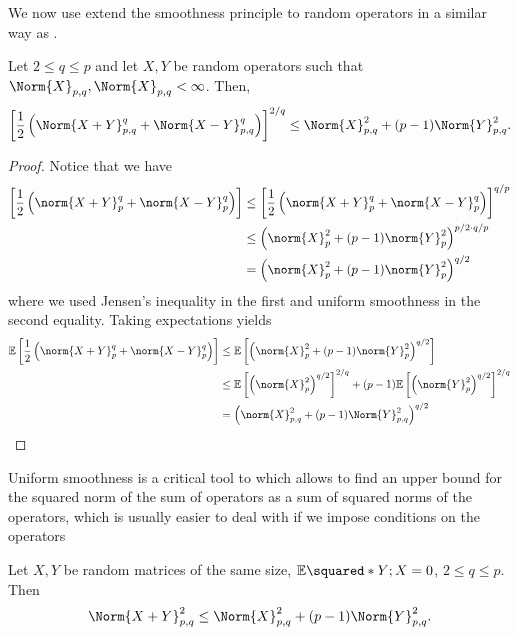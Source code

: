 We now use extend the smoothness principle to random operators in a similar way as \cite{huang2020matrix}.
\begin{corl}
    Let \( 2 \leq q \leq p \) and let \( X,Y \) be random operators such that \( \Norm{X}_{p,q}, \Norm{X}_{p,q}< \infty \). Then,
\[ \left[ \frac{1}{2} \left(\Norm{X+Y}_{p,q}^{q}+ \Norm{X-Y}_{p,q}^{q}\right)\right]^{2/q}\leq \Norm{X}_{p,q}^{2}+ (p-1) \Norm{Y}_{p,q}^{2}. \]
\end{corl}

\begin{proof}
    Notice that we have 
    \begin{align*}
      \left[\frac{1}{2}\left(\norm{X+Y}_{p}^{q}+\norm{X-Y}_{p}^{q}\right)\right] & \leq \left[\frac{1}{2}\left(\norm{X+Y}_{p}^{q}+\norm{X-Y}_{p}^{q}\right)\right]^{q/p} \\
       & \leq \left(\norm{X}_{p}^{2}+ (p-1) \norm{Y}_{p}^{2}\right)^{p/2 \cdot q/p} \\
       &= \left(\norm{X}_{p}^{2}+ (p-1) \norm{Y}_{p}^{2}\right)^{q/2}
    \end{align*}
       where we used Jensen's inequality in the first and uniform smoothness in the second equality. Taking expectations yields
       \begin{align*}
         \mathbb{E}\left[\frac{1}{2}\left(\norm{X+Y}_{p}^{q}+\norm{X-Y}_{p}^{q}\right)\right] & \leq \mathbb{E}\left[ \left(\norm{X}_{p}^{2}+ (p-1) \norm{Y}_{p}^{2}\right)^{q/2}\right] \\
         & \leq \mathbb{E}\left[ \left(\norm{X}_{p}^{2}\right)^{q/2}\right]^{2/q}+(p-1)\mathbb{E}\left[\left(\norm{Y}_{p}^{2}\right)^{q/2}\right]^{2/q} \\
         & = \left(\norm{X}_{p,q}^{2} + (p-1)\Norm{Y}_{p,q}^{2}\right)^{q/2}
       \end{align*}
\end{proof}


Uniform smoothness is a critical tool to which allows to find an upper bound for the squared norm of the sum of operators as a sum of squared norms of the operators, which is usually easier to deal with if we impose conditions on the operators

\begin{thm}
    Let \( X,Y \) be random matrices of the same size, \( \mathbb{E} \squared*{Y;X}=0 \), \( 2 \leq q \leq p \). Then
  \[ \Norm{X+Y}_{p,q}^{2} \leq \Norm{X}_{p,q}^{2}+ (p-1) \Norm{Y}_{p,q}^{2}. \]
\end{thm}


